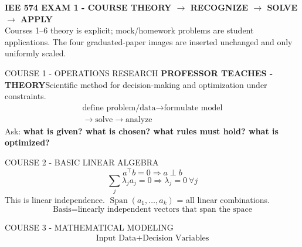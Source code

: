 \documentclass[10pt,landscape]{article}
\newcommand{\teach}{\textbf{PROFESSOR TEACHES - THEORY}\quad}
\begin{document}
\fontsize{5.65}{5.95}\selectfont
\begin{center}
{\fontsize{10.4}{10.7}\selectfont\bfseries IEE 574 EXAM 1 - COURSE THEORY $\rightarrow$ RECOGNIZE $\rightarrow$ SOLVE $\rightarrow$ APPLY}\\[-1pt]
{\fontsize{5.9}{6.1}\selectfont Courses 1--6 theory is explicit; mock/homework problems are student applications. The four graduated-paper images are inserted unchanged and only uniformly scaled.}
\end{center}\vspace{-1.5pt}

{\fontsize{5.25}{5.50}\selectfont
\noindent
\begin{minipage}[t]{0.245\textwidth}\vspace{0pt}
\begin{theorybox}{COURSE 1 - OPERATIONS RESEARCH}
\teach Scientific method for decision-making and optimization under constraints.
\[
\boxed{\begin{gathered}
\text{define problem/data}\to\text{formulate model}\\[-1pt]
\to\text{solve}\to\text{analyze}
\end{gathered}}
\]
Ask: \textbf{what is given? what is chosen? what rules must hold? what is optimized?}
\end{theorybox}
\end{minipage}\hfill
\begin{minipage}[t]{0.245\textwidth}\vspace{0pt}
\begin{theorybox}{COURSE 2 - BASIC LINEAR ALGEBRA}
\[
\boxed{a^\top b=0\Rightarrow a\perp b}
\]
\[
\boxed{\sum_j\lambda_j a_j=0\Rightarrow\lambda_j=0\ \forall j}
\]
This is linear independence. $\operatorname{Span}(a_1,\ldots,a_k)$ = all linear combinations.
\[
\boxed{\text{Basis}=\text{linearly independent vectors that span the space}}
\]
\end{theorybox}
\end{minipage}\hfill
\begin{minipage}[t]{0.245\textwidth}\vspace{0pt}
\begin{theorybox}{COURSE 3 - MATHEMATICAL MODELING}
\[
\boxed{\begin{gathered}
\text{Input Data}+\text{Decision Variables}\\[-1pt]

\end{gathered}}\]
\end{theorybox}
\end{minipage}}
\end{document}
